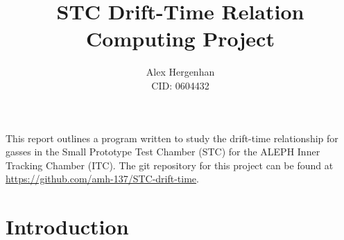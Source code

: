 \documentclass[11pt]{article}
\begin{document}
\title{STC Drift-Time Relation\\\normalsize Computing Project}
\author{Alex Hergenhan\\CID: 0604432}
\maketitle

This report outlines a program written to study the drift-time relationship for gasses in the Small Prototype Test Chamber (STC) for the ALEPH Inner Tracking Chamber (ITC). The git repository for this project can be found at \url{https://github.com/amh-137/STC-drift-time}.

\section{Introduction}
\label{sec:intro}
\end{document}
